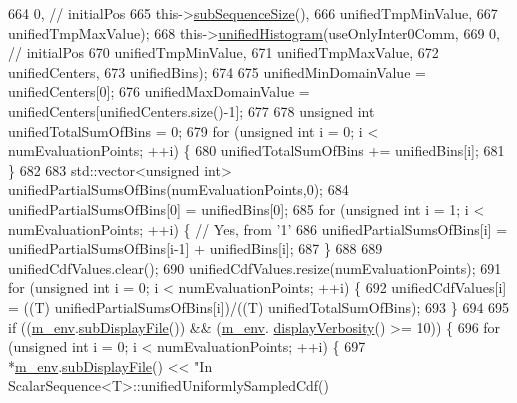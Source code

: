 \begin{DoxyCode}
664                                0, \textcolor{comment}{// initialPos}
665                                this->\hyperlink{class_q_u_e_s_o_1_1_scalar_sequence_a0288ea295eedc216a1617b3286f6f3a0}{subSequenceSize}(),
666                                unifiedTmpMinValue,
667                                unifiedTmpMaxValue);
668       this->\hyperlink{class_q_u_e_s_o_1_1_scalar_sequence_a805023aa45f97a89c19a5f5d0cc7db34}{unifiedHistogram}(useOnlyInter0Comm,
669                              0, \textcolor{comment}{// initialPos}
670                              unifiedTmpMinValue,
671                              unifiedTmpMaxValue,
672                              unifiedCenters,
673                              unifiedBins);
674 
675       unifiedMinDomainValue = unifiedCenters[0];
676       unifiedMaxDomainValue = unifiedCenters[unifiedCenters.size()-1];
677 
678       \textcolor{keywordtype}{unsigned} \textcolor{keywordtype}{int} unifiedTotalSumOfBins = 0;
679       \textcolor{keywordflow}{for} (\textcolor{keywordtype}{unsigned} \textcolor{keywordtype}{int} i = 0; i < numEvaluationPoints; ++i) \{
680         unifiedTotalSumOfBins += unifiedBins[i];
681       \}
682 
683       std::vector<unsigned int> unifiedPartialSumsOfBins(numEvaluationPoints,0);
684       unifiedPartialSumsOfBins[0] = unifiedBins[0];
685       \textcolor{keywordflow}{for} (\textcolor{keywordtype}{unsigned} \textcolor{keywordtype}{int} i = 1; i < numEvaluationPoints; ++i) \{ \textcolor{comment}{// Yes, from '1'}
686         unifiedPartialSumsOfBins[i] = unifiedPartialSumsOfBins[i-1] + unifiedBins[i];
687       \}
688 
689       unifiedCdfValues.clear();
690       unifiedCdfValues.resize(numEvaluationPoints);
691       \textcolor{keywordflow}{for} (\textcolor{keywordtype}{unsigned} \textcolor{keywordtype}{int} i = 0; i < numEvaluationPoints; ++i) \{
692         unifiedCdfValues[i] = ((T) unifiedPartialSumsOfBins[i])/((T) unifiedTotalSumOfBins);
693       \}
694 
695       \textcolor{keywordflow}{if} ((\hyperlink{class_q_u_e_s_o_1_1_scalar_sequence_a71618cd6351b29361b437af68447a4c8}{m\_env}.\hyperlink{class_q_u_e_s_o_1_1_base_environment_a8a0064746ae8dddfece4229b9ad374d6}{subDisplayFile}()) && (\hyperlink{class_q_u_e_s_o_1_1_scalar_sequence_a71618cd6351b29361b437af68447a4c8}{m\_env}.
      \hyperlink{class_q_u_e_s_o_1_1_base_environment_a1fe5f244fc0316a0ab3e37463f108b96}{displayVerbosity}() >= 10)) \{
696         \textcolor{keywordflow}{for} (\textcolor{keywordtype}{unsigned} \textcolor{keywordtype}{int} i = 0; i < numEvaluationPoints; ++i) \{
697           *\hyperlink{class_q_u_e_s_o_1_1_scalar_sequence_a71618cd6351b29361b437af68447a4c8}{m\_env}.\hyperlink{class_q_u_e_s_o_1_1_base_environment_a8a0064746ae8dddfece4229b9ad374d6}{subDisplayFile}() << \textcolor{stringliteral}{"In ScalarSequence<T>::unifiedUniformlySampledCdf()
}
\end{DoxyCode}
